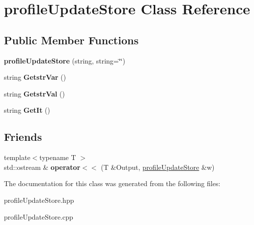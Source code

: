 \hypertarget{classprofileUpdateStore}{
\section{profileUpdateStore Class Reference}
\label{classprofileUpdateStore}
}
\subsection*{Public Member Functions}
\begin{DoxyCompactItemize}
\item 
\hypertarget{classprofileUpdateStore_a9befa25c24c51e242860b4460a08a6d0}{
{\bfseries profileUpdateStore} (string, string=\char`\"{}\char`\"{})}
\label{classprofileUpdateStore_a9befa25c24c51e242860b4460a08a6d0}

\item 
\hypertarget{classprofileUpdateStore_a94271f240ff424d82930be10d60aa5ad}{
string {\bfseries GetstrVar} ()}
\label{classprofileUpdateStore_a94271f240ff424d82930be10d60aa5ad}

\item 
\hypertarget{classprofileUpdateStore_aa47104a802ef830830c7009c039c58b1}{
string {\bfseries GetstrVal} ()}
\label{classprofileUpdateStore_aa47104a802ef830830c7009c039c58b1}

\item 
\hypertarget{classprofileUpdateStore_ac534c3f7c719434f31e350443c6c783f}{
string {\bfseries GetIt} ()}
\label{classprofileUpdateStore_ac534c3f7c719434f31e350443c6c783f}

\end{DoxyCompactItemize}
\subsection*{Friends}
\begin{DoxyCompactItemize}
\item 
\hypertarget{classprofileUpdateStore_affc9878690c5c32b164325be5ebe0278}{
{\footnotesize template$<$typename T $>$ }\\std::ostream \& {\bfseries operator$<$$<$} (T \&Output, \hyperlink{classprofileUpdateStore}{profileUpdateStore} \&w)}
\label{classprofileUpdateStore_affc9878690c5c32b164325be5ebe0278}

\end{DoxyCompactItemize}


The documentation for this class was generated from the following files:\begin{DoxyCompactItemize}
\item 
profileUpdateStore.hpp\item 
profileUpdateStore.cpp\end{DoxyCompactItemize}
